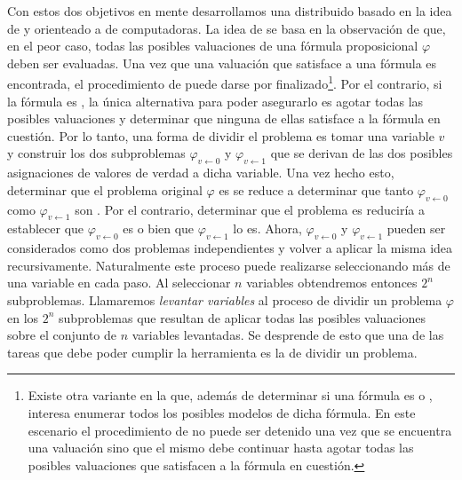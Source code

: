 Con estos dos objetivos en mente desarrollamos una \ssolver distribuido basado
en la idea de \gp y orienteado a \clusters de computadoras. La idea de \gp se
basa en la observación de que, en el peor caso, todas las posibles valuaciones
de una fórmula proposicional $\varphi$ deben ser evaluadas. Una vez que una
valuación que satisface a una fórmula es encontrada, el procedimiento de
\ssolving puede darse por finalizado\footnote{Existe otra variante en la que, además
de determinar si una fórmula es \sat o \unsat, interesa enumerar todos los
posibles modelos de dicha fórmula. En este escenario el procedimiento de
\ssolving no puede ser detenido una vez que se encuentra una valuación sino
que el mismo debe continuar hasta agotar todas las posibles valuaciones que
satisfacen a la fórmula en cuestión.}. Por el contrario, si la fórmula es
\unsat, la única alternativa para poder asegurarlo es agotar todas las
posibles valuaciones y determinar que ninguna de ellas satisface a la fórmula
en cuestión. Por lo tanto, una forma de dividir el problema es tomar una
variable $v$ y construir los dos subproblemas $\varphi_{v \leftarrow 0}$ y
$\varphi_{v \leftarrow 1}$ que se derivan de las dos posibles asignaciones de
valores de verdad a dicha variable. Una vez hecho esto, determinar que el
problema original $\varphi$ es \unsat se reduce a determinar que tanto
$\varphi_{v \leftarrow 0}$ como $\varphi_{v \leftarrow 1}$ son \unsat. Por el
contrario, determinar que el problema es \sat reduciría a establecer que
$\varphi_{v \leftarrow 0}$ es \sat o bien que $\varphi_{v \leftarrow 1}$ lo
es. Ahora, $\varphi_{v \leftarrow 0}$ y $\varphi_{v \leftarrow 1}$ pueden ser
considerados como dos problemas independientes y volver a aplicar la misma
idea recursivamente. Naturalmente este proceso puede realizarse seleccionando
más de una variable en cada paso. Al seleccionar $n$ variables obtendremos
entonces $2^n$ subproblemas. Llamaremos \emph{levantar variables} al proceso
de dividir un problema $\varphi$ en los $2^n$ subproblemas que resultan de
aplicar todas las posibles valuaciones sobre el conjunto de $n$ variables
levantadas. Se desprende de esto que una de las tareas que debe poder cumplir
la herramienta es la de dividir un problema.


